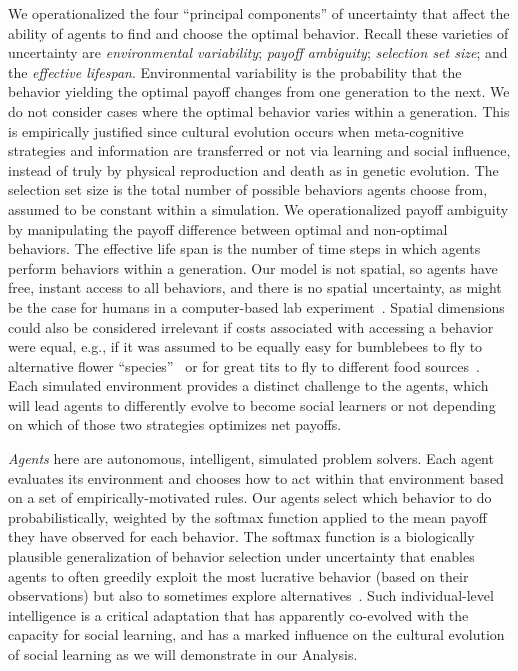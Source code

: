 \documentclass[letterpaper,11.5pt]{scrartcl}
\begin{document}
We operationalized the four ``principal components'' of uncertainty that affect the
ability of agents to find and choose the optimal behavior. Recall these varieties of
uncertainty are \emph{environmental variability}; \emph{payoff ambiguity};
\emph{selection set size}; and the \emph{effective lifespan}. Environmental
variability is the probability that the behavior yielding the optimal payoff changes
from one generation to the next. We do not consider cases where the optimal behavior
varies within a generation. This is empirically justified since cultural evolution
occurs when meta-cognitive strategies and information are transferred or not via
learning and social influence, instead of truly by physical reproduction and death
as in genetic evolution.  The selection set size is the total number of possible
behaviors agents choose from, assumed to be constant within a simulation.  We
operationalized payoff ambiguity by manipulating the payoff difference between optimal
and non-optimal behaviors. The effective life span is the
number of time steps in which agents perform behaviors within a generation. 
Our model is not spatial, so agents have free, instant
access to all behaviors, and there is no spatial uncertainty, 
as might be the case for humans in a computer-based lab
experiment~\cite{McElreath2005,Morgan2012}.  Spatial dimensions could also be
considered irrelevant if costs associated with accessing a behavior were equal,
e.g., if it was assumed to be equally easy for bumblebees to fly to alternative
flower ``species''~\cite{Baracchi2018} or for great tits to fly to different food
sources~\cite{Aplin2017}.  Each simulated environment provides a distinct challenge
to the agents, which will lead agents to differently evolve to become social
learners or not depending on which of those two strategies optimizes net payoffs.

\emph{Agents} here are autonomous, intelligent, simulated problem solvers. Each
agent evaluates its environment and chooses how to act within that environment based
on a set of empirically-motivated rules.  Our agents select which behavior to do
probabilistically, weighted by the softmax function applied to the mean payoff they
have observed for each behavior. The softmax function is a biologically plausible
generalization of behavior selection under uncertainty that enables agents to often
greedily exploit the most lucrative behavior (based on their observations) but also
to sometimes explore alternatives~\cite{Schulz2019,Collins2013,Daw2006,Yechiam2005}.
Such individual-level intelligence is a critical adaptation that has apparently
co-evolved with the capacity for social learning, and has a marked influence on the
cultural evolution of social learning as we will demonstrate in our Analysis.
\end{document}
